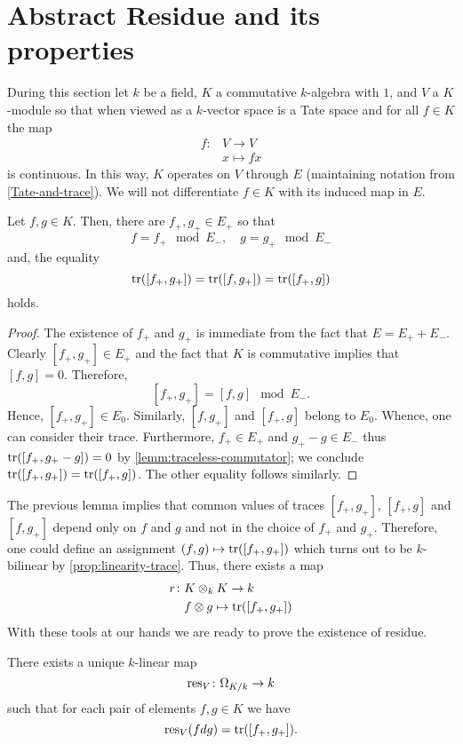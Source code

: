 \section{Abstract Residue and its properties}
During this section let $k$ be a field, $K$ a commutative $k$-algebra with $1$, and $V$ a $K$-module so that when viewed as a $k$-vector space is a Tate space and for all $f \in K$ the map 
\begin{align*}
	f\colon &V \to V \\
	&x \mapsto fx 
\end{align*}
is continuous. In this way, $K$ operates on $V$ through $E$ (maintaining notation from \cref{Tate-and-trace}). We will not differentiate $f\in K$ with its induced map in $E$.
\begin{lemma}\label{lemm:trace-only-depends-on-K}
	Let $f,g \in K$. Then, there are $f_{+}, g_{+} \in E_{+}$ so that 
	\[
	f = f_{+} \mod E_{-} ,\quad g = g_{+} \mod E_{-}
	\]
	and, the equality
	\[
		\operatorname{tr}([f_{+},g_{+}]) = \operatorname{tr}([f, g_{+}]) = \operatorname{tr}([f_{+}, g])
	\]
	holds.
\end{lemma}
\begin{proof}
The existence of $f_{+}$ and $g_{+}$ is immediate from the fact that $E = E_{+} + E_{-}$.  Clearly $[f_{+},g_{+}]\in E_{+}$ and the fact that $K$ is commutative implies that $[f,g] = 0$. Therefore,
\[
	[f_{+},g_{+}] = [f,g] \mod E_{-}.
\]
Hence, $[f_{+},g_{+}]\in E_0$. Similarly, $[f,g_{+}]$ and $[f_{+}, g]$ belong to $E_{0}$. Whence, one can consider their trace. Furthermore, $f_{+} \in E_{+}$ and $g_{+} - g \in E_{-}$ thus $\operatorname{tr}([f_{+}, g_{+} - g]) = 0$ by \cref{lemm:traceless-commutator}; we conclude $\operatorname{tr}([f_{+}, g_{+}]) = \operatorname{tr}([f_{+}, g])$. The other equality follows similarly.
\end{proof}
The previous lemma implies that common values of traces $[f_{+},g_{+}]$, $[f_{+}, g]$ and $[f, g_{+}]$ depend only on $f$ and $g$ and not in the choice of $f_{+}$ and $g_{+}$. Therefore, one could define an assignment $(f,g) \mapsto \operatorname{tr}([f_{+}, g_{+}])$ which turns out to be $k$-bilinear by \cref{prop:linearity-trace}. Thus, there exists a map
\begin{align*}
	r\colon &K\otimes_{k} K \to k \\
	&f \otimes g \mapsto \operatorname{tr}([f_{+}, g_{+}])
\end{align*}
With these tools at our hands we are ready to prove the existence of residue.
\begin{theorem}\label{thm:existence-of-residue}
	There exists a unique $k$-linear map
	\[
		\operatorname{res}_{V}\colon \Omega_{K/k}\to k
	\]
	such that for each pair of elements $f,g \in K$ we have
	\[
		\operatorname{res}_{V}(fdg) = \operatorname{tr}([f_{+}, g_{+}]).
	\]
\end{theorem}
